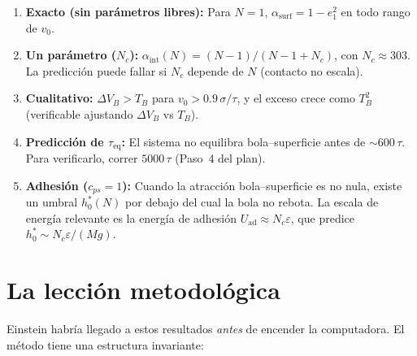\documentclass[11pt, a4paper]{article}
\begin{document}
\begin{enumerate}
  \item \textbf{Exacto (sin parámetros libres):}
        Para $N=1$, $\alpha_\text{surf} = 1 - e_1^2$ en todo rango de $v_0$.

  \item \textbf{Un parámetro ($N_c$):}
        $\alpha_\text{int}(N) = (N-1)/(N-1+N_c)$, con $N_c \approx 303$.
        La predicción puede fallar si $N_c$ depende de $N$ (contacto
        no escala).

  \item \textbf{Cualitativo:}
        $\Delta V_B > T_B$ para $v_0 > 0.9\,\sigma/\tau$, y el exceso
        crece como $T_B^2$ (verificable ajustando $\Delta V_B$ vs $T_B$).

  \item \textbf{Predicción de $\tau_\text{eq}$:}
        El sistema no equilibra bola--superficie antes de $\sim 600\,\tau$.
        Para verificarlo, correr $5000\,\tau$ (Paso~4 del plan).

  \item \textbf{Adhesión ($c_{ps}=1$):}
        Cuando la atracción bola--superficie es no nula, existe un
        umbral $h_0^*(N)$ por debajo del cual la bola no rebota.
        La escala de energía relevante es la energía de adhesión
        $U_\text{ad} \approx N_c \varepsilon$, que predice
        $h_0^* \sim N_c\varepsilon / (Mg)$.
\end{enumerate}

\section{La lección metodológica}

Einstein habría llegado a estos resultados \emph{antes} de encender
la computadora. El método tiene una estructura invariante:
\end{document}
